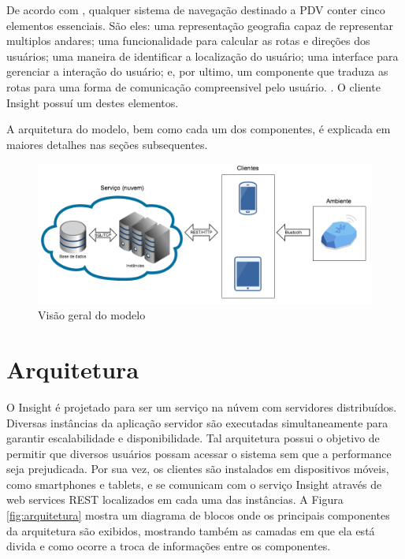 \documentclass[english,brazilian]{UNISINOSmonografia}
\begin{document}
De acordo com , qualquer sistema de navegação destinado a PDV conter cinco elementos essenciais. São eles: uma representação geografia capaz de representar multiplos andares; uma funcionalidade para calcular as rotas e direções dos usuários; uma maneira de identificar a localização do usuário; uma interface para gerenciar a interação do usuário; e, por ultimo, um componente que traduza as rotas para uma forma de comunicação compreensivel pelo usuário. \cite{gedawy2011designing}. O cliente Insight possuí um destes elementos.

A arquitetura do modelo, bem como cada um dos componentes, é explicada em maiores detalhes nas seções subsequentes.

\begin{figure}[!ht]
	\caption{Visão geral do modelo}
	\label{fig:visaoGeral}
	\centering%
	\begin{minipage}{.8\textwidth}
		\includegraphics[width=\textwidth]{imgs/visaoGeral}
	\end{minipage}
\end{figure}

	\section{Arquitetura}
O Insight é projetado para ser um serviço na núvem com servidores distribuídos. Diversas instâncias da aplicação servidor são executadas simultaneamente para garantir escalabilidade e disponibilidade. Tal arquitetura possui o objetivo de permitir que diversos usuários possam acessar o sistema sem que a performance seja prejudicada. Por sua vez, os clientes são instalados em dispositivos móveis, como smartphones e tablets, e se comunicam com o serviço Insight através de web services REST localizados em cada uma das instâncias. A Figura \ref{fig:arquitetura} mostra um diagrama de blocos onde os principais componentes da arquitetura são exibidos, mostrando também as camadas em que ela está divida e como ocorre a troca de informações entre os componentes. 
\end{document}
